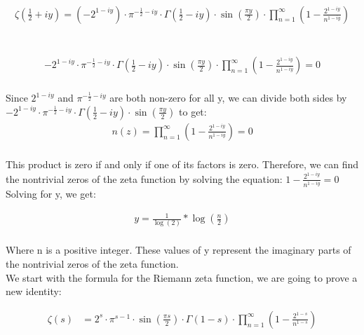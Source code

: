 \documentclass{article}
\begin{document}
 \\

\begin{align*}
\zeta\left(\frac{1}{2}+iy\right) = (-2^{1-iy}) \cdot \pi^{-\frac{1}{2}-iy}\cdot \Gamma\left(\frac{1}{2}-iy\right) \cdot \sin\left(\frac{\pi y}{2}\right) \cdot \prod_{n=1}^{\infty}\left(1-\frac{2^{1-iy}}{n^{1-iy}}\right)\\
\end{align*}

 \\

\begin{align*}
-2^{1-iy}\cdot \pi^{-\frac{1}{2}-iy}\cdot \Gamma\left(\frac{1}{2}-iy\right) \cdot \sin\left(\frac{\pi y}{2}\right) \cdot \prod_{n=1}^{\infty}\left(1-\frac{2^{1-iy}}{n^{1-iy}}\right) = 0\\
\end{align*}

Since $2^{1-iy}$ and $\pi^{-\frac{1}{2}-iy}$ are both non-zero for all y, we can divide both sides by  $-2^{1-iy}\cdot \pi^{-\frac{1}{2}-iy}\cdot \Gamma\left(\frac{1}{2}-iy\right) \cdot \sin\left(\frac{\pi y}{2}\right)$ to get: \\

\begin{align*}
n(z)=\prod_{n=1}^{\infty}\left(1-\frac{2^{1-iy}}{n^{1-iy}}\right) = 0 \\
\end{align*}

This product is zero if and only if one of its factors is zero. Therefore, we can find the nontrivial zeros of the zeta function by solving the equation: $1-\frac{2^{1-iy}}{n^{1-iy}} = 0$ Solving for y, we get:

\begin{align*}
y = \frac{1}{\log(2)} * \log\left(\frac{n}{2}\right) \\
\end{align*}

Where n is a positive integer. These values of y represent the imaginary parts of the nontrivial zeros of the zeta function. \\

We start with the formula for the Riemann zeta function, we are going to prove a new identity:

\begin{align*}
\zeta(s) &= 2^{s}\cdot\pi^{s-1}\cdot\sin(\frac{\pi s}{2})\cdot\Gamma(1-s)\cdot\prod_{n=1}^{\infty}(1-\frac{2^{1-s}}{n^{1-s}}) \\
\end{align*}
\end{document}
